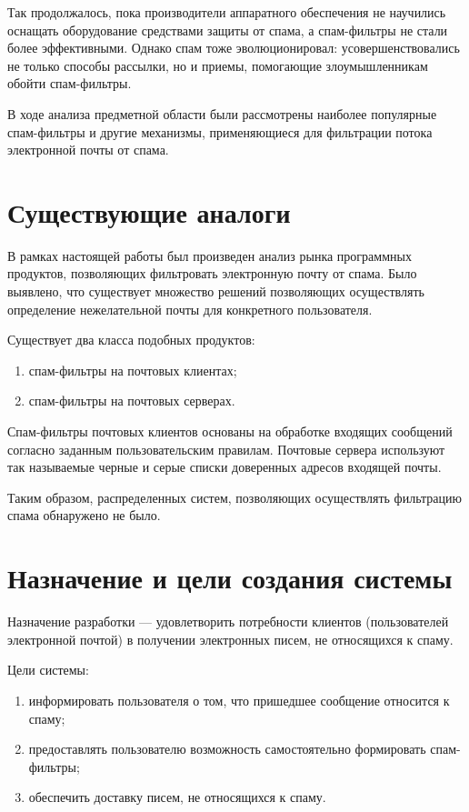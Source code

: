 Так продолжалось, пока производители аппаратного обеспечения не научились оснащать оборудование средствами защиты от спама, а спам-фильтры не стали более эффективными. Однако спам тоже эволюционировал: усовершенствовались не только способы рассылки, но и приемы, помогающие злоумышленникам обойти спам-фильтры. 

В ходе анализа предметной области были рассмотрены наиболее популярные спам-фильтры и другие механизмы, применяющиеся для фильтрации потока электронной почты от спама.


\section{Существующие аналоги}
В рамках настоящей работы был произведен анализ рынка программных продуктов, позволяющих фильтровать электронную почту от спама. Было выявлено, что существует множество решений позволяющих осуществлять определение нежелательной почты для конкретного пользователя. 

Существует два класса подобных продуктов:
\begin{enumerate}
	\item спам-фильтры на почтовых клиентах;
	\item спам-фильтры на почтовых серверах. 
\end{enumerate}

Спам-фильтры почтовых клиентов основаны на обработке входящих сообщений согласно заданным пользовательским правилам.  Почтовые сервера используют так называемые черные и серые списки доверенных адресов входящей почты.

Таким образом, распределенных систем, позволяющих осуществлять фильтрацию спама обнаружено не было.


\section{Назначение и цели создания системы}
Назначение разработки --- удовлетворить потребности клиентов (пользователей электронной почтой) в получении электронных писем, не относящихся к спаму.

Цели системы:
\begin{enumerate}
	\item информировать пользователя о том, что пришедшее сообщение относится к спаму;
	\item предоставлять пользователю возможность самостоятельно формировать спам-фильтры;
	\item обеспечить доставку писем, не относящихся к спаму.
\end{enumerate}

